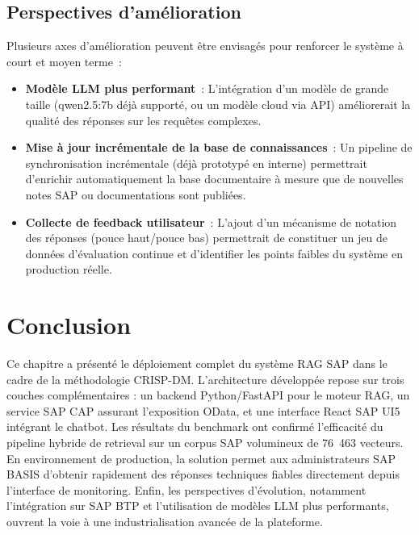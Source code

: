 \subsection{Perspectives d'amélioration}

Plusieurs axes d'amélioration peuvent être envisagés pour renforcer le système à court et moyen terme~:

\begin{itemize}[leftmargin=2em]
   \item \textbf{Modèle LLM plus performant}~: L'intégration d'un modèle de grande taille (qwen2.5:7b déjà supporté, ou un modèle cloud via API) améliorerait la qualité des réponses sur les requêtes complexes.

  \item \textbf{Mise à jour incrémentale de la base de connaissances}~: Un pipeline de synchronisation incrémentale (déjà prototypé en interne) permettrait d'enrichir automatiquement la base documentaire à mesure que de nouvelles notes SAP ou documentations sont publiées.

  \item \textbf{Collecte de feedback utilisateur}~: L'ajout d'un mécanisme de notation des réponses (pouce haut/pouce bas) permettrait de constituer un jeu de données d'évaluation continue et d'identifier les points faibles du système en production réelle.
\end{itemize}

\section*{Conclusion}
Ce chapitre a présenté le déploiement complet du système RAG SAP dans le cadre de la méthodologie CRISP-DM. L’architecture développée repose sur trois couches complémentaires : un backend Python/FastAPI pour le moteur RAG, un service SAP CAP assurant l’exposition OData, et une interface React SAP UI5 intégrant le chatbot. Les résultats du benchmark ont confirmé l’efficacité du pipeline hybride de retrieval sur un corpus SAP volumineux de 76~463 vecteurs. En environnement de production, la solution permet aux administrateurs SAP BASIS d’obtenir rapidement des réponses techniques fiables directement depuis l’interface de monitoring. Enfin, les perspectives d’évolution, notamment l’intégration sur SAP BTP et l’utilisation de modèles LLM plus performants, ouvrent la voie à une industrialisation avancée de la plateforme.